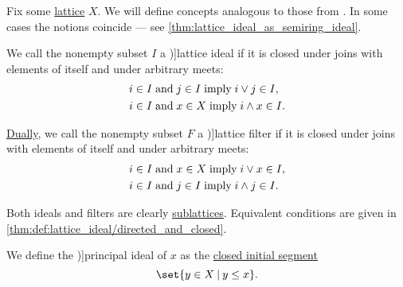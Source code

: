 \begin{definition}\label{def:lattice_ideal}
  Fix some \hyperref[def:lattice]{lattice} \( X \). We will define concepts analogous to those from . In some cases the notions coincide --- see \cref{thm:lattice_ideal_as_semiring_ideal}.

  \begin{paracol}{2}
    \begin{leftcolumn}
      We call the nonempty subset \( I \) a \term[ru=решёточный идеал (\cite[def. 4.5]{Гуров2013ТеорияРешёток})]{lattice ideal} if it is closed under joins with elements of itself and under arbitrary meets:
      \small
      \begin{align}
        &i \in I \T{and} j \in I \T{imply} i \vee j \in I, \label{eq:def:lattice_ideal/lattice_join} \\
        &i \in I \T{and} x \in X \T{imply} i \wedge x \in I. \label{eq:def:lattice_ideal/lattice_meet}
      \end{align}
      \normalsize
    \end{leftcolumn}

    \begin{rightcolumn}
      \hyperref[thm:lattice_duality]{Dually}, we call the nonempty subset \( F \) a \term[ru=решёточный фильтр (\cite[def. 4.5]{Гуров2013ТеорияРешёток})]{lattice filter} if it is closed under joins with elements of itself and under arbitrary meets:
      \small
      \begin{align}
        &i \in I \T{and} x \in X \T{imply} i \vee x \in I, \label{eq:def:lattice_ideal/filter_join} \\
        &i \in I \T{and} j \in I \T{imply} i \wedge j \in I. \label{eq:def:lattice_ideal/filter_meet}
      \end{align}
      \normalsize
    \end{rightcolumn}
  \end{paracol}

  Both ideals and filters are clearly \hyperref[def:lattice/submodel]{sublattices}. Equivalent conditions are given in \cref{thm:def:lattice_ideal/directed_and_closed}.

  \begin{thmenum}
    \begin{paracol}{2}
      \begin{leftcolumn}
        We define the \term[ru=главный (идеал) (\cite[140]{Гуров2013ТеорияРешёток})]{principal ideal} of \( x \) as the \hyperref[def:order_interval/unbounded]{closed initial segment}
        \begin{equation*}
          \set{ y \in X \given y \leq x }.
        \end{equation*}
      \end{leftcolumn}


\end{paracol}
\end{thmenum}
\end{definition}
